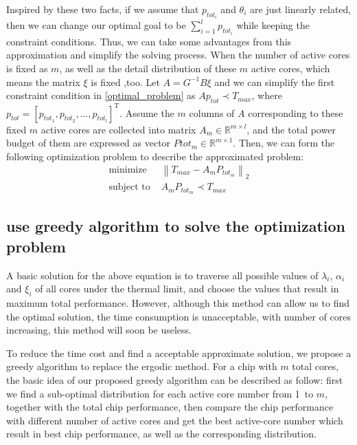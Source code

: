 Inspired by these two facts, if we assume that $p_{tot_{i}}$ and $\theta_i$ are just linearly related, then we can change our optimal goal to be $\sum_{i=1}^l p_{tot_{i}}$ 
while keeping the constraint conditions. 
Thus, we can take some advantages from this approximation and simplify the solving process. When the number of active cores is fixed as $m$, as well as the detail 
distribution of these $m$ active cores, which means the matrix $\xi$ is fixed ,too. 
Let $A=G^{-1} B \xi$ and we can simplify the first constraint condition in \eqref{optimal_problem} as $A p_{tot} \prec T_{max}$, where $p_{tot}=[p_{{tot}_{1}},p_{{tot}_{2}},\ldots,p_{{tot}_{l}}]^ \mathrm{ T }$.
Assume the $m$ columns of $A$ corresponding to these fixed $m$ active cores are collected into matrix $A_m \in \mathbb{R}^{m \times l}$, and the total 
power budget of them are expressed as vector $P{{tot}_m} \in \mathbb{R}^{m \times 1}$. Then, we can form the following optimization problem to describe the approximated problem:
\begin{equation}
\begin{split}
\text{minimize} \,\, &\left\|T_{max}-A_m P_{{tot}_m}\right\|_2 \\
\text{subject to}\,\, &A_m P_{{tot}_m} \prec T_{max}
\end{split}
\end{equation}
 

\subsection{use greedy algorithm to solve the optimization problem}
A basic solution for the above equation is to traverse all possible values of $\lambda_i$, $\alpha_i$ and $\xi_i$ of all cores under the thermal limit,
and choose the values that result in maximum total performance. However, although this method can allow us to find the optimal solution, the time consumption
is unacceptable, with number of cores increasing, this method will soon be useless.

To reduce the time cost and find a acceptable approximate solution, we propose a greedy algorithm to replace the ergodic method.
For a chip with $m$ total cores, the basic idea of our proposed greedy algorithm can be described as follow: first we find a sub-optimal distribution for each active
core number from \SI{1} to $m$, together with the total chip performance, then compare the chip performance with different number of active cores and get
the best active-core number which result in best chip performance, as well as the corresponding distribution.

